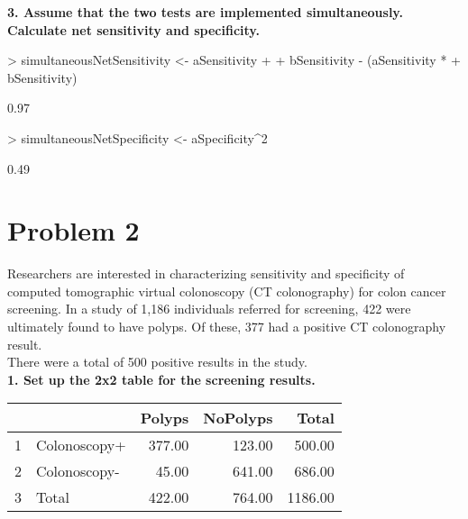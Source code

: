 \documentclass[12pt]{article}
\begin{document}
\newpage
\noindent \textbf{3. Assume that the two tests are implemented simultaneously.  Calculate net sensitivity and specificity.  }

\begin{Schunk}
\begin{Sinput}
> simultaneousNetSensitivity <- aSensitivity + 
+     bSensitivity - (aSensitivity * 
+     bSensitivity)
\end{Sinput}
\begin{Soutput}
[1] 0.97
\end{Soutput}
\begin{Sinput}
> simultaneousNetSpecificity <- aSpecificity^2
\end{Sinput}
\begin{Soutput}
[1] 0.49
\end{Soutput}
\end{Schunk}


\section*{Problem 2}
Researchers are interested in characterizing sensitivity and specificity of computed tomographic virtual colonoscopy (CT colonography) for colon cancer screening.  In a study of 1,186 individuals referred for screening, 422 were ultimately found to have polyps.  Of these, 377 had a positive CT colonography result. \\

There were a total of 500 positive results in the study. \\

\noindent \textbf{1. Set up the 2x2 table for the screening results.}


\begin{table}[H]
\caption*{Problem 2 table}
\begin{table}[ht]
\centering
\begin{tabular}{rlrrr}
  \hline
 &  & Polyps & NoPolyps & Total \\ 
  \hline
1 & Colonoscopy+ & 377.00 & 123.00 & 500.00 \\ 
  2 & Colonoscopy- & 45.00 & 641.00 & 686.00 \\ 
  3 & Total & 422.00 & 764.00 & 1186.00 \\ 
   \hline
\end{tabular}
\end{table}\end{table}
\end{document}
